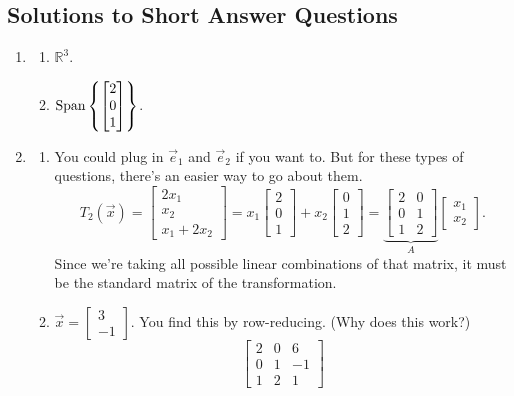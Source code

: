 \subsection{Solutions to Short Answer Questions}
\begin{enumerate}
	\item \begin{enumerate}
			\item \(\mathbb{R}^3\).
			\item \(\operatorname{Span}\left\{\begin{bmatrix}2 \\ 0 \\ 1\end{bmatrix}\right\}\).
		\end{enumerate}
	\item \begin{enumerate}
			\item You could plug in \(\vec{e}_1\) and \(\vec{e}_2\) if you want to. But for these types of questions, there's an easier way to go about them.
				\[T_2(\vec{x}) = \begin{bmatrix}2x_1 \\ x_2 \\ x_1 + 2x_2\end{bmatrix} = x_1\begin{bmatrix}2 \\ 0 \\ 1\end{bmatrix} + x_2\begin{bmatrix}0 \\ 1 \\ 2\end{bmatrix} = \underbrace{\begin{bmatrix}2 & 0 \\ 0 & 1 \\ 1 & 2\end{bmatrix}}_{A}\begin{bmatrix}x_1 \\ x_2\end{bmatrix}.\]
				Since we're taking all possible linear combinations of that matrix, it must be the standard matrix of the transformation.
			\item \(\vec{x} = \begin{bmatrix}3 \\ -1\end{bmatrix}.\) You find this by row-reducing. (Why does this work?) 
				\[\left[\!\!\begin{array}{cc|c}2 & 0 & 6\\ 0 & 1 & -1\\ 1 & 2 & 1\end{array}\!\!\right] 
\]
\end{enumerate}
\end{enumerate}
